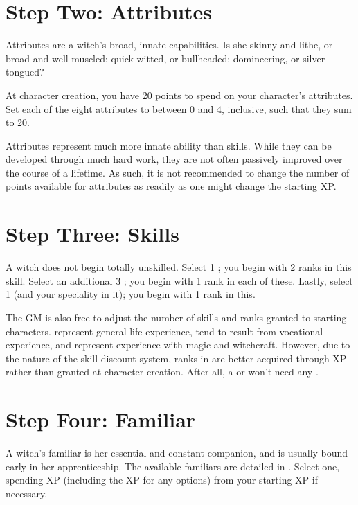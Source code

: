 \section{Step Two: Attributes}

Attributes are a witch's broad, innate capabilities.
Is she skinny and lithe, or broad and well-muscled; quick-witted, or bullheaded; domineering, or silver-tongued?

At character creation, you have 20 points to spend on your character's attributes.
Set each of the eight attributes to between 0 and 4, inclusive, such that they sum to 20.

Attributes represent much more innate ability than skills.
While they can be developed through much hard work, they are not often passively improved over the course of a lifetime.
As such, it is not recommended to change the number of points available for attributes as readily as one might change the starting XP.

\section{Step Three: Skills}

A witch does not begin totally unskilled.
Select 1 {\generalskill}; you begin with 2 ranks in this skill.
Select an additional 3 {\generalskills}; you begin with 1 rank in each of these.
Lastly, select 1 {\specialityskill} (and your speciality in it); you begin with 1 rank in this.

The GM is also free to adjust the number of skills and ranks granted to starting characters.
\capital{\generalskills} represent general life experience, {\specialityskills} tend to result from vocational experience, and {\disciplineskills} represent experience with magic and witchcraft.
However, due to the nature of the skill discount system, ranks in {\disciplineskills} are better acquired through XP rather than granted at character creation.
After all, a  or  won't need any {\disciplineskills}.

\section{Step Four: Familiar}

A witch's familiar is her essential and constant companion, and is usually bound early in her apprenticeship.
The available familiars are detailed in .
Select one, spending XP (including the XP for any options) from your starting XP if necessary.


